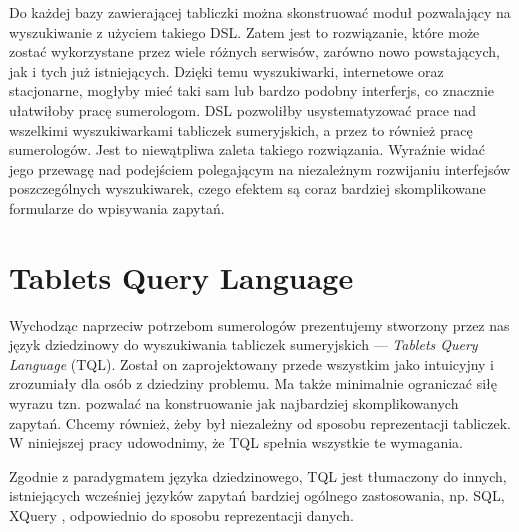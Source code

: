 Do każdej bazy zawierającej tabliczki można skonstruować moduł pozwalający na wyszukiwanie z użyciem takiego DSL.
Zatem jest to rozwiązanie, które może zostać wykorzystane przez wiele różnych serwisów, zarówno nowo powstających, jak i tych już 
istniejących. Dzięki temu wyszukiwarki, internetowe oraz stacjonarne, mogłyby mieć taki sam lub bardzo podobny interferjs, co znacznie 
ułatwiłoby pracę sumerologom. DSL pozwoliłby usystematyzować prace nad wszelkimi wyszukiwarkami tabliczek sumeryjskich, a przez to również 
pracę sumerologów. Jest to niewątpliwa zaleta takiego rozwiązania. Wyraźnie widać jego przewagę nad podejściem polegającym na niezależnym 
rozwijaniu interfejsów poszczególnych wyszukiwarek, czego efektem są coraz bardziej skomplikowane formularze do wpisywania zapytań.


\section*{Tablets Query Language}

Wychodząc naprzeciw potrzebom sumerologów prezentujemy stworzony przez nas język dziedzinowy do wyszukiwania tabliczek sumeryjskich --- 
\textit{Tablets Query Language} (TQL). Został on zaprojektowany przede wszystkim jako intuicyjny i zrozumiały dla osób z dziedziny problemu.
 Ma także minimalnie ograniczać siłę wyrazu tzn. pozwalać na konstruowanie jak najbardziej skomplikowanych zapytań. Chcemy również, żeby 
był niezależny od sposobu reprezentacji tabliczek. W niniejszej pracy udowodnimy, że TQL spełnia wszystkie te wymagania. 

Zgodnie z paradygmatem języka dziedzinowego, TQL jest tłumaczony do innych, istniejących wcześniej języków zapytań bardziej 
ogólnego zastosowania, np. SQL, XQuery \cite{xquery}, odpowiednio do sposobu reprezentacji danych.



